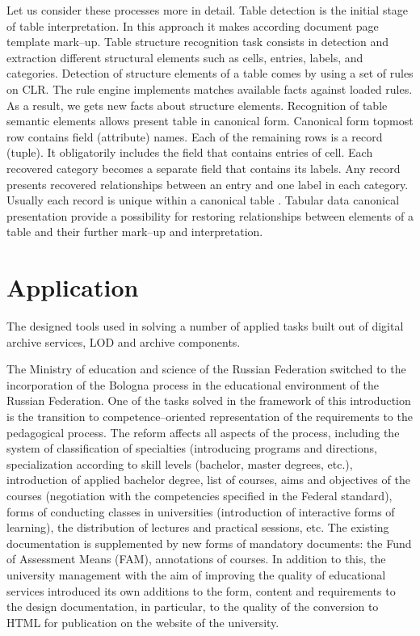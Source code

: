 \documentclass[conference,a4paper]{IEEEtran}
\begin{document}
Let us consider these processes more in detail. Table detection is the initial stage of table interpretation. In this approach it makes according document page template mark--up. Table structure recognition task consists in detection and extraction different structural elements such as cells, entries, labels, and categories. Detection of structure elements of a table comes by using a set of rules on CLR. The rule engine implements matches available facts against loaded rules. As a result, we gets new facts about structure elements. Recognition of table semantic elements allows present table in canonical form. Canonical form topmost row contains field (attribute) names. Each of the remaining rows is a record (tuple). It obligatorily includes the field that contains entries of cell. Each recovered category becomes a separate field that contains its labels. Any record presents recovered relationships between an entry and one label in each category. Usually each record is unique within a canonical table \cite{Shigarov_2016}. Tabular data canonical presentation provide a possibility for restoring relationships between elements of a table and their further mark--up and interpretation.

\section{Application}

The designed tools used in solving a number of applied tasks built out
of digital archive services, LOD and archive components.

The Ministry of education and science of the Russian Federation switched to the incorporation of the
Bologna process in the educational environment of the Russian
Federation. One of the tasks solved in the framework of this
introduction is the transition to competence--oriented representation of
the requirements to the pedagogical process. The reform affects all
aspects of the process, including the system of classification of
specialties (introducing programs and directions, specialization
according to skill levels (bachelor, master degrees, etc.), introduction
of applied bachelor degree, list of courses, aims and objectives of the
courses (negotiation with the competencies specified in the Federal
standard), forms of conducting classes in universities (introduction of
interactive forms of learning), the distribution of lectures and
practical sessions, etc. The existing documentation is supplemented by
new forms of mandatory documents: the Fund of Assessment Means (FAM),
annotations of courses. In addition to this, the university management
with the aim of improving the quality of educational services introduced
its own additions to the form, content and requirements to the design
documentation, in particular, to the quality of the conversion to HTML
for publication on the website of the university.
\end{document}
